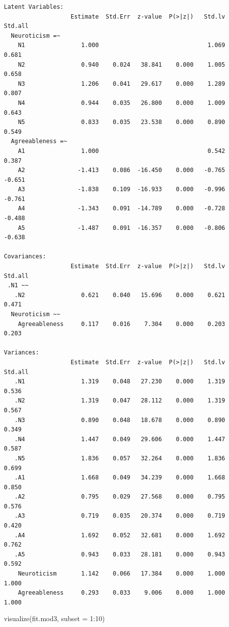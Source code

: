 \documentclass[
  letterpaper,
  DIV=11,
  numbers=noendperiod]{scrreprt}
\newenvironment{Shaded}{\begin{snugshade}}{\end{snugshade}}
\newcommand{\AttributeTok}[1]{\textcolor[rgb]{0.40,0.45,0.13}{#1}}
\newcommand{\DecValTok}[1]{\textcolor[rgb]{0.68,0.00,0.00}{#1}}
\newcommand{\FunctionTok}[1]{\textcolor[rgb]{0.28,0.35,0.67}{#1}}
\newcommand{\NormalTok}[1]{\textcolor[rgb]{0.00,0.23,0.31}{#1}}
\newcommand{\SpecialCharTok}[1]{\textcolor[rgb]{0.37,0.37,0.37}{#1}}
\begin{document}
\begin{verbatim}
Latent Variables:
                   Estimate  Std.Err  z-value  P(>|z|)   Std.lv  Std.all
  Neuroticism =~                                                        
    N1                1.000                               1.069    0.681
    N2                0.940    0.024   38.841    0.000    1.005    0.658
    N3                1.206    0.041   29.617    0.000    1.289    0.807
    N4                0.944    0.035   26.800    0.000    1.009    0.643
    N5                0.833    0.035   23.538    0.000    0.890    0.549
  Agreeableness =~                                                      
    A1                1.000                               0.542    0.387
    A2               -1.413    0.086  -16.450    0.000   -0.765   -0.651
    A3               -1.838    0.109  -16.933    0.000   -0.996   -0.761
    A4               -1.343    0.091  -14.789    0.000   -0.728   -0.488
    A5               -1.487    0.091  -16.357    0.000   -0.806   -0.638

Covariances:
                   Estimate  Std.Err  z-value  P(>|z|)   Std.lv  Std.all
 .N1 ~~                                                                 
   .N2                0.621    0.040   15.696    0.000    0.621    0.471
  Neuroticism ~~                                                        
    Agreeableness     0.117    0.016    7.304    0.000    0.203    0.203

Variances:
                   Estimate  Std.Err  z-value  P(>|z|)   Std.lv  Std.all
   .N1                1.319    0.048   27.230    0.000    1.319    0.536
   .N2                1.319    0.047   28.112    0.000    1.319    0.567
   .N3                0.890    0.048   18.678    0.000    0.890    0.349
   .N4                1.447    0.049   29.606    0.000    1.447    0.587
   .N5                1.836    0.057   32.264    0.000    1.836    0.699
   .A1                1.668    0.049   34.239    0.000    1.668    0.850
   .A2                0.795    0.029   27.568    0.000    0.795    0.576
   .A3                0.719    0.035   20.374    0.000    0.719    0.420
   .A4                1.692    0.052   32.681    0.000    1.692    0.762
   .A5                0.943    0.033   28.181    0.000    0.943    0.592
    Neuroticism       1.142    0.066   17.384    0.000    1.000    1.000
    Agreeableness     0.293    0.033    9.006    0.000    1.000    1.000
\end{verbatim}

\begin{Shaded}
\begin{Highlighting}[]
\FunctionTok{visualize}\NormalTok{(fit.mod3, }
          \AttributeTok{subset =} \DecValTok{1}\SpecialCharTok{:}\DecValTok{10}\NormalTok{)}
\end{Highlighting}
\end{Shaded}
\end{document}
